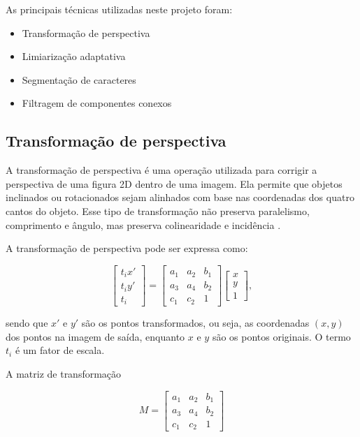 As principais técnicas utilizadas neste projeto foram:

\begin{itemize}
    \item Transformação de perspectiva
    \item Limiarização adaptativa
    \item Segmentação de caracteres
    \item Filtragem de componentes conexos
\end{itemize}

\subsection{Transformação de perspectiva}

A transformação de perspectiva é uma operação utilizada para corrigir a perspectiva de uma figura 2D dentro de uma imagem. Ela permite que objetos inclinados ou rotacionados sejam alinhados com base nas coordenadas dos quatro cantos do objeto. Esse tipo de transformação não preserva paralelismo, comprimento e ângulo, mas preserva colinearidade e incidência \cite{perspective-transform}.

A transformação de perspectiva pode ser expressa como:

\begin{equation}
    \begin{bmatrix}
        t_i x' \\
        t_i y' \\
        t_i
    \end{bmatrix}
    =
    \begin{bmatrix}
        a_1 & a_2 & b_1 \\
        a_3 & a_4 & b_2 \\
        c_1 & c_2 & 1
    \end{bmatrix}
    \begin{bmatrix}
        x \\
        y \\
        1
    \end{bmatrix},
\end{equation}

sendo que $x'$ e $y'$ são os pontos transformados, ou seja, as coordenadas $(x,y)$ dos pontos na imagem de saída, enquanto $x$ e $y$ são os pontos originais. O termo $t_i$ é um fator de escala.

A matriz de transformação

\begin{equation}
    M
    =
    \begin{bmatrix}
        a_1 & a_2 & b_1 \\
        a_3 & a_4 & b_2 \\
        c_1 & c_2 & 1
    \end{bmatrix}
\end{equation}

